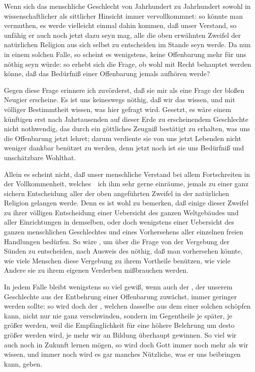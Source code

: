 \begin{aufza}
\item Wenn sich das menschliche Geschlecht von Jahrhundert zu Jahrhundert sowohl in wissenschaftlicher als sittlicher Hinsicht immer vervollkommnet: so könnte man vermuthen, es werde vielleicht einmal dahin kommen, daß unser Verstand, so unfähig er auch noch jetzt dazu seyn mag, alle die oben erwähnten Zweifel der natürlichen Religion aus sich selbst zu entscheiden im Stande seyn werde. Da nun in einem solchen Falle, so scheint es wenigstens, keine Offenbarung mehr für uns nöthig seyn würde: so erhebt sich die Frage, ob wohl mit Recht behauptet werden könne, daß das Bedürfniß einer Offenbarung jemals aufhören werde?
\item Gegen diese Frage erinnere ich zuvörderst, daß sie mir als eine Frage der bloßen Neugier erscheine. Es ist uns keineswegs nöthig, daß wir das wissen, und mit völliger Bestimmtheit wissen, was hier gefragt wird. Gesetzt, es wäre einem künftigen erst nach Jahrtausenden auf dieser Erde zu erscheinendem Geschlechte nicht nothwendig, das durch ein göttliches Zeugniß bestätigt zu erhalten, was uns die Offenbarung jetzt lehret; darum verdiente sie von uns jetzt Lebenden nicht weniger dankbar benützet zu werden, denn jetzt noch ist sie uns Bedürfniß und unschätzbare Wohlthat.
\item Allein es scheint nicht, daß unser menschliche Verstand bei allem Fortschreiten in der Vollkommenheit, welches~\ ich ihm sehr gerne einräume, jemals zu einer ganz sichern Entscheidung aller der oben angeführten Zweifel in der natürlichen Religion gelangen werde. Denn es ist wohl zu bemerken, daß einige dieser Zweifel zu ihrer völligen Entscheidung einer Uebersicht des ganzen Weltgebäudes und aller Einrichtungen in demselben, oder doch wenigstens einer Uebersicht des ganzen menschlichen Geschlechtes und eines Vorhersehens aller einzelnen freien Handlungen bedürfen. So wäre \zB , um über die Frage von der Vergebung der Sünden zu entscheiden, nach Ausweis des  nöthig, daß man vorhersehen könnte, wie viele Menschen diese Vergebung zu ihrem Vortheile benützen, wie viele Andere sie zu ihrem eigenen Verderben mißbrauchen werden.
\item In jedem Falle bleibt wenigstens so viel gewiß, wenn auch der , der unserem Geschlechte aus der Entbehrung einer Offenbarung zuwächst, immer geringer werden sollte: so wird doch der , welchen dasselbe aus dem  einer solchen schöpfen kann, nicht nur nie ganz verschwinden, sondern im Gegentheile je später, je größer werden, weil die Empfänglichkeit für eine höhere Belehrung um desto größer werden wird, je mehr wir an Bildung überhaupt gewinnen. So viel wir auch noch in Zukunft lernen mögen, so wird doch Gott immer noch mehr als wir wissen, und immer noch wird es gar manches Nützliche, was er uns beibringen kann, geben.
\end{aufza}
   
